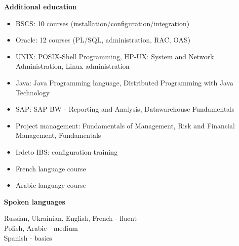 \documentclass[10pt,a4paper]{extbook}
\begin{document}
\par\vspace{5mm}
{\large \textbf {Additional education} \par}
\begin{itemize}[noitemsep,topsep=3mm,parsep=0pt,partopsep=0pt,itemindent=0pt,leftmargin=4mm]
	\item BSCS: 10 courses (installation/configuration/integration)
	\item Oracle: 12 courses (PL/SQL, administration, RAC, OAS)
	\item UNIX: POSIX-Shell Programming, HP-UX: System and Network Administration, Linux administration
	\item Java: Java Programming language, Distributed Programming with Java Technology
	\item SAP: SAP BW - Reporting and Analysis, Datawarehouse Fundamentals
	\item Project management: Fundamentals of Management, Risk and Financial Management, Fundamentals
	\item Irdeto IBS: configuration training
	\item French language course
	\item Arabic language course
\end{itemize}

\par\vspace{5mm}
{\large \textbf {Spoken languages} \par}
\vspace{2mm}
Russian, Ukrainian, English, French - fluent \\
Polish, Arabic - medium \\
Spanish - basics
\end{document}

